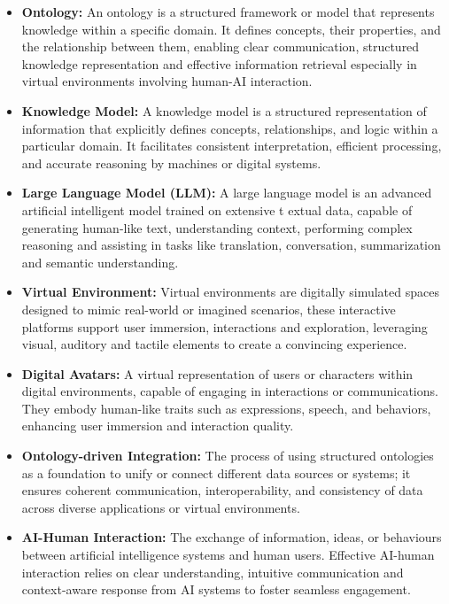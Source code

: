 \documentclass[a4paper,11pt,oneside]{article}
\begin{document}
  \begin{itemize}
    \item \textbf{Ontology:} An ontology is a structured framework or model that represents knowledge within a specific domain. 
    It defines concepts, their properties, and the relationship between them, enabling clear communication, structured knowledge 
    representation and effective information retrieval especially in virtual environments involving human-AI interaction.
    
    \item \textbf{Knowledge Model:} A knowledge model is a structured representation of information that explicitly defines concepts, 
    relationships, and logic within a particular domain. It facilitates consistent interpretation, efficient processing, and accurate 
    reasoning by machines or digital systems.
    
    \item \textbf{Large Language Model (LLM):} A large language model is an advanced artificial intelligent model trained on extensive t
    extual data, capable of generating human-like text, understanding context, performing complex reasoning and assisting in tasks like 
    translation, conversation, summarization and semantic understanding.
    
    \item \textbf{Virtual Environment:} Virtual environments are digitally simulated spaces designed to mimic real-world or imagined 
    scenarios, these interactive platforms support user immersion, interactions and exploration, leveraging visual, auditory and 
    tactile elements to create a convincing experience.
    
    \item \textbf{Digital Avatars:} A virtual representation of users or characters within digital environments, capable of engaging in 
    interactions or communications. They embody human-like traits such as expressions, speech, and behaviors, enhancing user immersion and interaction quality.
    
    \item \textbf{Ontology-driven Integration:} The process of using structured ontologies as a foundation to unify or connect different 
    data sources or systems; it ensures coherent communication, interoperability, and consistency of data across diverse applications or virtual environments.
    
    \item \textbf{AI-Human Interaction:} The exchange of information, ideas, or behaviours between artificial intelligence systems and 
    human users. Effective AI-human interaction relies on clear understanding, intuitive communication and context-aware response from 
    AI systems to foster seamless engagement.
    

\end{itemize}
\end{document}
